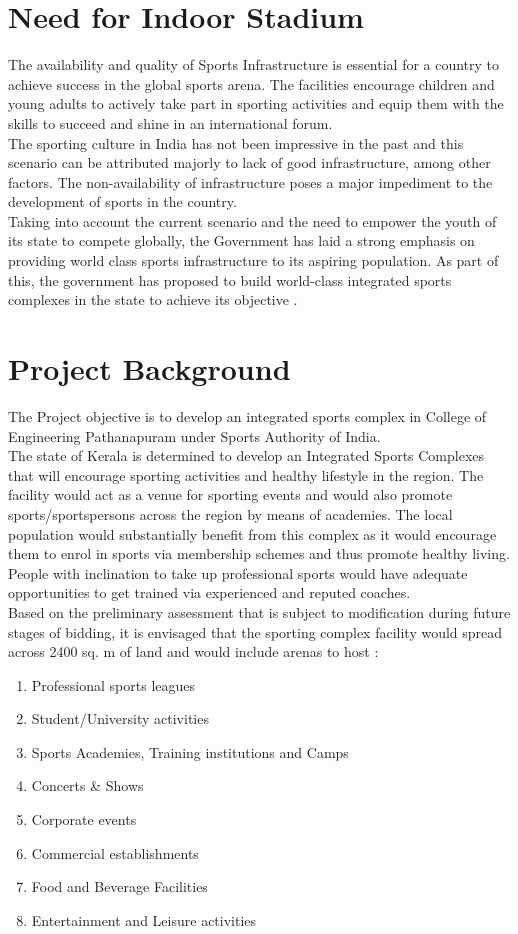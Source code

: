 \section{Need for Indoor Stadium}
The availability and quality of Sports Infrastructure is essential for a country to achieve success in
the global sports arena. The facilities encourage children and young adults to actively take part in
sporting activities and equip them with the skills to succeed and shine in an international forum.
\\The sporting culture in India has not been impressive in the past and this scenario can be attributed
majorly to lack of good infrastructure, among other factors. The non-availability of infrastructure
poses a major impediment to the development of sports in the country.
\\ Taking into account the current scenario and the need to
empower the youth of its state to compete globally, the Government has laid a
strong emphasis on providing world class sports infrastructure to its aspiring population. As part
of this, the government has proposed to build world-class integrated sports complexes in the state
to achieve its objective .\\


\section{Project Background}
The Project objective is to develop an integrated sports complex in College of Engineering Pathanapuram under Sports Authority of India.\\
The state of Kerala is determined to develop an Integrated Sports Complexes that will
encourage sporting activities and healthy lifestyle in the region. The facility would act as a venue
for  sporting events and would also promote sports/sportspersons across
the region by means of academies. The local population would substantially benefit from this
complex as it would encourage them to enrol in sports via membership schemes and thus promote
healthy living. People with inclination to take up professional sports would have adequate
opportunities to get trained via experienced and reputed coaches.\\
Based on the preliminary assessment that is subject to modification during future stages of bidding,
it is envisaged that the sporting complex facility would spread across 2400 sq. m of land and would
include arenas to host : 
\begin{enumerate}
	\item Professional sports leagues
	\item Student/University activities
	\item Sports Academies, Training institutions and Camps
	\item Concerts \& Shows
	\item Corporate events
	\item Commercial establishments
	\item Food and Beverage Facilities
	\item Entertainment and Leisure activities
\end{enumerate}

